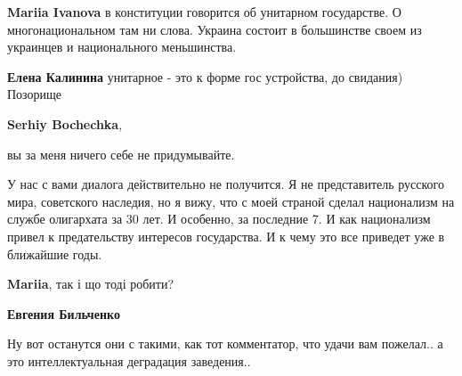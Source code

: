 \begin{itemize}
\begin{itemize}
\textbf{Mariia Ivanova} в конституции говорится об унитарном государстве. О многонациональном там ни слова. Украина состоит в большинстве своем из украинцев и национального меньшинства.

 
\textbf{Елена Калинина} унитарное - это к форме гос устройства, до свидания)
Позорище

 
\textbf{Serhiy Bochechka}, 

вы за меня ничего себе не придумывайте.

У нас с вами диалога действительно не получится. Я не представитель русского
мира, советского наследия, но я вижу, что с моей страной сделал национализм на
службе олигархата за 30 лет. И особенно, за последние 7. И как национализм
привел к предательству интересов государства. И к чему это все приведет уже в
ближайшие годы.


 
\textbf{Mariia}, так і що тоді робити?

\end{itemize}

 
\textbf{Евгения Бильченко} 

Ну вот останутся они с такими, как тот комментатор, что удачи вам пожелал.. а
это интеллектуальная деградация заведения..

\begin{itemize}
 


\end{itemize}
\end{itemize}

